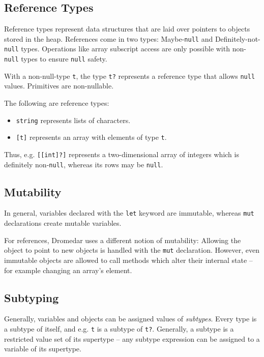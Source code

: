 \documentclass{article}
\newcommand{\code}[1]{\lstinline[columns=fixed]{#1}}
\begin{document}
		\subsection{Reference Types}
		
			Reference types represent data structures that are laid over pointers to objects stored in the heap. References come in two types: Maybe-\code{null} and Definitely-not-\code{null} types. Operations like array subscript access are only possible with non-\code{null} types to ensure \code{null} safety.
			
			With a non-null-type \code{t}, the type \code{t?} represents a reference type that allows \code{null} values. Primitives are non-nullable.
			
			The following are reference types:
			
			\begin{itemize}
				\item \code{string} represents lists of characters.
				\item \code{[t]} represents an array with elements of type \code{t}.
			\end{itemize}
		
			Thus, e.g. \code{[[int]?]} represents a two-dimensional array of integers which is definitely non-\code{null}, whereas its rows may be \code{null}.
		
		\subsection{Mutability}
		
			In general, variables declared with the \code{let} keyword are immutable, whereas \code{mut} declarations create mutable variables.
			
			For references, Dromedar uses a different notion of mutability: Allowing the object to point to new objects is handled with the \code{mut} declaration. However, even immutable objects are allowed to call methods which alter their internal state -- for example changing an array's element.
			
		\subsection{Subtyping}
		
			Generally, variables and objects can be assigned values of \textit{subtypes}. Every type is a subtype of itself, and e.g. \code{t} is a subtype of \code{t?}. Generally, a subtype is a restricted value set of its supertype -- any subtype expression can be assigned to a variable of its supertype.
		
\end{document}
